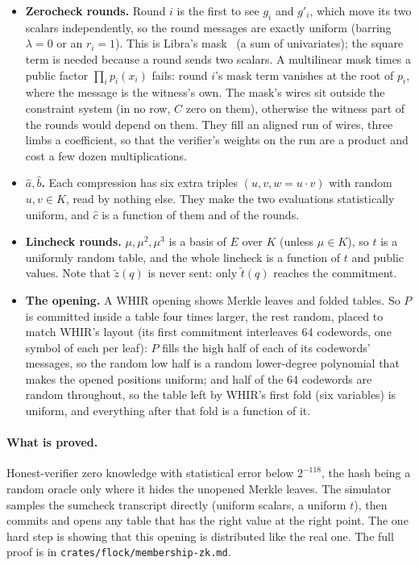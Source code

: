 \documentclass[11pt]{article}
\newcommand{\K}{K}
\newcommand{\E}{E}
\newcommand{\mle}[1]{\widetilde{#1}}
\newcommand{\code}[1]{\texttt{#1}}
\begin{document}
\begin{itemize}[itemsep=0.4em]
  \item \textbf{Zerocheck rounds.} Round $i$ is the first to see $g_i$ and $g'_i$, which move its two scalars independently, so the round messages are exactly uniform (barring $\lambda = 0$ or an $r_i = 1$). This is Libra's mask~\cite{Libra} (a sum of univariates); the square term is needed because a round sends two scalars. A multilinear mask times a public factor $\prod_i p_i(x_i)$ fails: round $i$'s mask term vanishes at the root of $p_i$, where the message is the witness's own. The mask's wires sit outside the constraint system (in no row, $C$ zero on them), otherwise the witness part of the rounds would depend on them. They fill an aligned run of wires, three limbs a coefficient, so that the verifier's weights on the run are a product and cost a few dozen multiplications.
  \item \textbf{$\hat a, \hat b$.} Each compression has six extra triples $(u, v, w = u \cdot v)$ with random $u, v \in \K$, read by nothing else. They make the two evaluations statistically uniform, and $\hat c$ is a function of them and of the rounds.
  \item \textbf{Lincheck rounds.} $\mu, \mu^2, \mu^3$ is a basis of $\E$ over $\K$ (unless $\mu \in \K$), so $t$ is a uniformly random table, and the whole lincheck is a function of $t$ and public values. Note that $\mle z(q)$ is never sent: only $\mle t(q)$ reaches the commitment.
  \item \textbf{The opening.} A WHIR opening shows Merkle leaves and folded tables. So $P$ is committed inside a table four times larger, the rest random, placed to match WHIR's layout (its first commitment interleaves 64 codewords, one symbol of each per leaf): $P$ fills the high half of each of its codewords' messages, so the random low half is a random lower-degree polynomial that makes the opened positions uniform; and half of the 64 codewords are random throughout, so the table left by WHIR's first fold (six variables) is uniform, and everything after that fold is a function of it.
\end{itemize}

\paragraph{What is proved.} Honest-verifier zero knowledge with statistical error below $2^{-118}$, the hash being a random oracle only where it hides the unopened Merkle leaves. The simulator samples the sumcheck transcript directly (uniform scalars, a uniform $t$), then commits and opens any table that has the right value at the right point. The one hard step is showing that this opening is distributed like the real one. The full proof is in \code{crates/flock/membership-zk.md}.
\end{document}
